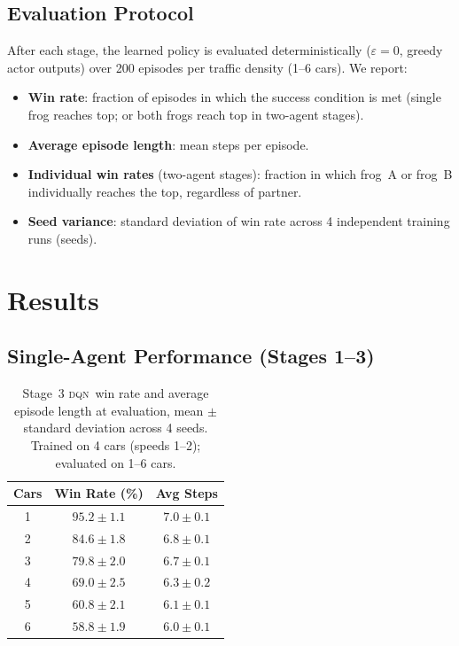 \documentclass[12pt]{article}
\newcommand{\DQN}{\textsc{dqn}}
\begin{document}
\subsection{Evaluation Protocol}

After each stage, the learned policy is evaluated deterministically
($\varepsilon = 0$, greedy actor outputs) over 200 episodes per traffic
density (1--6 cars).  We report:
\begin{itemize}
  \item \textbf{Win rate}: fraction of episodes in which the success condition
        is met (single frog reaches top; or both frogs reach top in two-agent
        stages).
  \item \textbf{Average episode length}: mean steps per episode.
  \item \textbf{Individual win rates} (two-agent stages): fraction in which
        frog~A or frog~B individually reaches the top, regardless of partner.
  \item \textbf{Seed variance}: standard deviation of win rate across 4
        independent training runs (seeds).
\end{itemize}

\section{Results}
\label{sec:results}

\subsection{Single-Agent Performance (Stages 1--3)}
\label{sec:results_single}

\begin{table}[h]
\centering
\caption{Stage~3 \DQN\ win rate and average episode length at evaluation,
  mean $\pm$ standard deviation across 4 seeds.  Trained on 4 cars
  (speeds 1--2); evaluated on 1--6 cars.}
\label{tab:dqn_eval}
\renewcommand{\arraystretch}{1.2}
\begin{tabular}{ccc}
\toprule
\textbf{Cars} & \textbf{Win Rate (\%)} & \textbf{Avg Steps} \\
\midrule
1 & $95.2 \pm 1.1$ & $7.0 \pm 0.1$ \\
2 & $84.6 \pm 1.8$ & $6.8 \pm 0.1$ \\
3 & $79.8 \pm 2.0$ & $6.7 \pm 0.1$ \\
4 & $69.0 \pm 2.5$ & $6.3 \pm 0.2$ \\
5 & $60.8 \pm 2.1$ & $6.1 \pm 0.1$ \\
6 & $58.8 \pm 1.9$ & $6.0 \pm 0.1$ \\
\bottomrule
\end{tabular}
\end{table}
\end{document}

